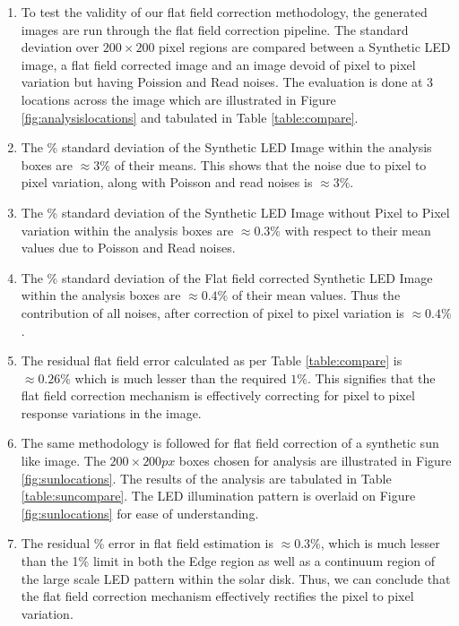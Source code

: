 \documentclass[11pt,a4paper]{article}
\begin{document}
	\begin{enumerate}
		\item To test the validity of our flat field correction methodology, the generated images are run through the flat field correction pipeline. The standard deviation over $200 \times 200$ pixel regions are compared between a Synthetic LED image, a flat field corrected image and an image devoid of pixel to pixel variation but having Poission and Read noises. The evaluation is done at 3 locations across the image which are illustrated in Figure \ref{fig:analysislocations} and tabulated in Table \ref{table:compare}.

		\item The \% standard deviation of the Synthetic LED Image within the analysis boxes are $\approx 3\%$ of their means. This shows that the noise due to pixel to pixel variation, along with Poisson and read noises is $\approx 3\%$.
		
		\item The \% standard deviation of the Synthetic LED Image without Pixel to Pixel variation within the analysis boxes are $\approx 0.3\%$ with respect to their mean values due to Poisson and Read noises.
		
		\item The \% standard deviation of the Flat field corrected Synthetic LED Image within the analysis boxes are $\approx 0.4\%$ of their mean values. Thus the contribution of all noises, after correction of pixel to pixel variation is $\approx 0.4\%$.
		
		\item The residual flat field error calculated as per Table \ref{table:compare} is $\approx 0.26\%$ which is much lesser than the required $1\%$. This signifies that the flat field correction mechanism is effectively correcting for pixel to pixel response variations in the image.
		
		\item The same methodology is followed for flat field correction of a synthetic sun like image. The $200\times200 px$ boxes chosen for analysis are illustrated in Figure \ref{fig:sunlocations}. The results of the analysis are tabulated in Table \ref{table:suncompare}. The LED illumination pattern is overlaid on Figure \ref{fig:sunlocations} for ease of understanding.
		
		\item The residual \% error in flat field estimation is $\approx 0.3\%$, which is much lesser than the 1\% limit in both the Edge region as well as a continuum region of the large scale LED pattern within the solar disk. Thus, we can conclude that the flat field correction mechanism effectively rectifies the pixel to pixel variation.
		

\end{enumerate}
\end{document}
